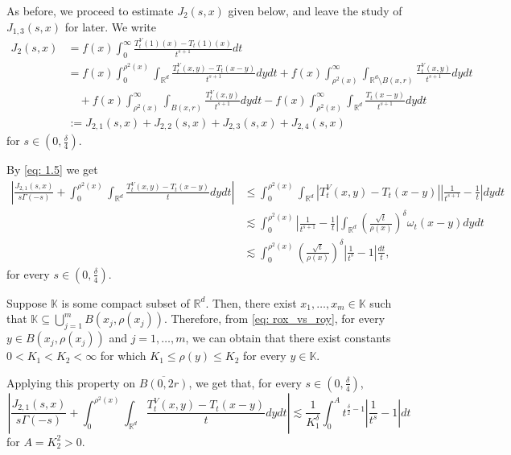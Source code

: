 \documentclass[10pt, a4paper, reqno]{amsart}
\theoremstyle{definition}
\theoremstyle{remark}
\newcommand{\RR}{\mathbb{R}}
\numberwithin{equation}{section}
\begin{document}
As before, we proceed to estimate $J_2(s,x)$ given below, and leave the study of $J_{1,3}(s,x)$ for later. We write
\begin{align*}
    J_2(s,x)&=f(x)\int_0^\infty \frac{T_t^V(1)(x)-T_t(1)(x)}{t^{s+1}} dt\\
    &=f(x)\int_0^{\rho^2(x)} \int_{\RR^d} \frac{T_t^V(x,y)-T_t(x-y)}{t^{s+1}}dydt +f(x)\int_{\rho^2(x)}^\infty \int_{\RR^d\setminus B(x,r)} \frac{T_t^V(x,y)}{t^{s+1}}dydt\\
    &\quad +f(x)\int_{\rho^2(x)}^\infty \int_{B(x,r)} \frac{T_t^V(x,y)}{t^{s+1}}dydt-f(x)\int_{\rho^2(x)}^\infty \int_{\RR^d} \frac{T_t(x-y)}{t^{s+1}}dydt\\
    &:=J_{2,1}(s,x)+J_{2,2}(s,x)+J_{2,3}(s,x)+J_{2,4}(s,x)
\end{align*}
for $s\in (0,\frac{\delta}{4})$.

By \eqref{eq: 1.5} we get
\begin{align*}
    \left|\frac{J_{2,1}(s,x)}{s\Gamma(-s)}+\int_0^{\rho^2(x)} \int_{\RR^d} \frac{T_t^V(x,y)-T_t(x-y)}{t}dydt\right|&\leq \int_0^{\rho^2(x)} \int_{\RR^d} |T_t^V(x,y)-T_t(x-y)|\left|\frac{1}{t^{s+1}}-\frac1t\right|dydt\\
    &\lesssim \int_0^{\rho^2(x)}\left|\frac{1}{t^{s+1}}-\frac1t\right| \int_{\RR^d} \left(\frac{\sqrt{t}}{\rho(x)}\right)^\delta \omega_t(x-y) dydt\\
    &\lesssim \int_0^{\rho^2(x)} \left(\frac{\sqrt{t}}{\rho(x)}\right)^\delta \left|\frac{1}{t^{s}}-1\right|\frac{dt}{t},
\end{align*}
for every $s\in (0,\frac{\delta}{4})$.

Suppose $\mathbb K$ is some compact subset of $\RR^d$. Then, there exist $x_1,\dots, x_m\in \mathbb K$ such that $\mathbb K\subseteq \bigcup_{j=1}^m B(x_j,\rho(x_j))$. Therefore, from \eqref{eq: rox_vs_roy}, for every $y\in B(x_j,\rho(x_j))$ and $j=1, \dots, m$, we can obtain that there exist constants $0<K_1<K_2<\infty$ for which $K_1\leq \rho(y)\leq K_2$ for every $y\in \mathbb K$.

Applying this property on $\overline{B(0,2r)}$, we get that, for every $s\in (0,\frac{\delta}{4})$,
\begin{equation*}
    \left|\frac{J_{2,1}(s,x)}{s\Gamma(-s)}+\int_0^{\rho^2(x)} \int_{\RR^d} \frac{T_t^V(x,y)-T_t(x-y)}{t}dydt\right|\lesssim \frac{1}{K_1^\delta} \int_0^{A} t^{\frac{\delta}{2}-1}\left|\frac{1}{t^{s}}-1\right|dt
\end{equation*}
for $A=K_2^2>0$.
\end{document}
